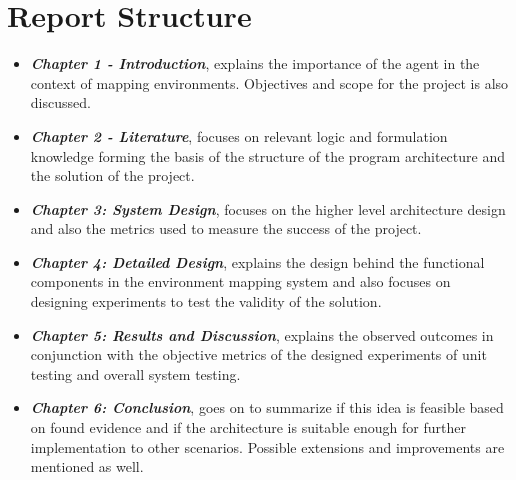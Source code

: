 \section{Report Structure}
\begin{itemize}
	\item \textbf{\textit{Chapter 1 - Introduction}}, explains the importance of the agent in the context of mapping environments. Objectives and scope for the project is also discussed. 
	

	\item \textbf{\textit{Chapter 2 -  Literature}}, focuses on relevant logic and formulation knowledge forming the basis of the structure of the program architecture and the solution of the project.

	\item \textbf{\textit{Chapter 3: System Design}}, focuses on the higher level architecture design and also the metrics used to measure the success of the project.
	
	\item \textbf{\textit{Chapter 4: Detailed Design}}, explains the design behind the functional components in the environment mapping system and also focuses on designing experiments to test the validity of the solution.
	
	\item \textbf{\textit{Chapter 5: Results and Discussion}}, explains the observed outcomes in conjunction with the objective metrics of the designed experiments of unit testing and overall system testing.
	
	\item \textbf{\textit{Chapter 6: Conclusion}}, goes on to summarize if this idea is feasible based on found evidence and if the architecture is suitable enough for further implementation to other scenarios. Possible extensions and improvements are mentioned as well.
\end{itemize}
